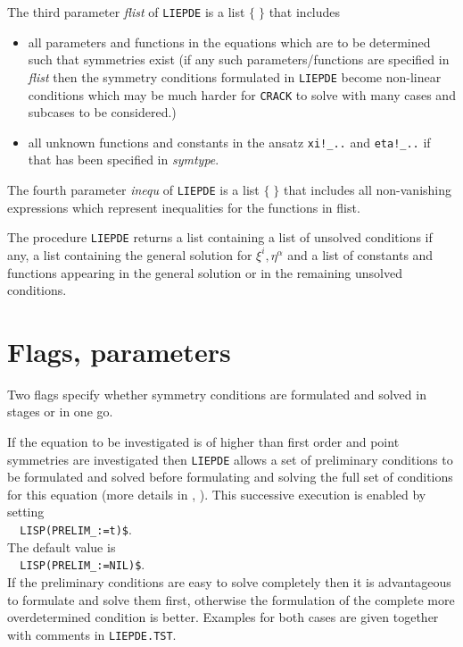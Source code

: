 \documentclass[12pt]{article}
\begin{document}
\noindent The third parameter {\it flist} of {\tt LIEPDE} is a list $\{\;\}$ 
that includes
\begin{itemize}
\item all parameters and functions in the equations which are to
      be determined such that symmetries exist (if any such 
      parameters/functions are 
      specified in {\it flist} then the symmetry conditions 
      formulated in {\tt LIEPDE}
      become non-linear conditions which may be much harder for
      {\tt CRACK} to solve with many cases and subcases to be considered.)
\item all unknown functions and constants in the ansatz 
      \verb+xi!_..+ and \verb+eta!_..+
      if that has been specified in {\it symtype}.
\end{itemize}
\noindent The fourth parameter {\it inequ} of {\tt LIEPDE} is a list $\{\;\}$ 
that includes all non-vanishing expressions which represent
inequalities for the functions in flist.

The procedure {\tt LIEPDE} returns a list containing a list of 
unsolved conditions if any, a list containing the general solution for 
$\xi^i, \eta^{\alpha}$ and a list of constants and functions appearing 
in the general solution or in the remaining unsolved conditions.

\section{Flags, parameters}
Two flags specify whether symmetry conditions are formulated 
and solved in stages or in one go. 

If the equation to be investigated is of higher than first order 
and point symmetries are investigated then {\tt LIEPDE} allows
a set of preliminary conditions 
to be formulated and solved before formulating and
solving the full set of conditions for this equation (more 
details in \cite{Step},
\cite{Wo}). This successive execution is enabled by setting \\
\verb+  LISP(PRELIM_:=t)$+. \\
The default value is \\ 
\verb+  LISP(PRELIM_:=NIL)$+. \\
If the preliminary conditions are easy to solve completely then 
it is advantageous
to formulate and solve them first, otherwise the formulation of 
the complete more
overdetermined condition is better. Examples for both cases are 
given together with comments in {\tt LIEPDE.TST}.
\end{document}
